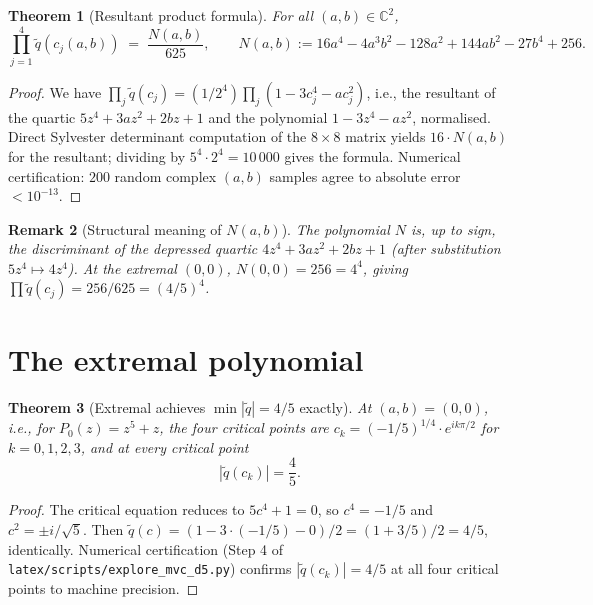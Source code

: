 \documentclass[11pt,a4paper]{article}
\newtheorem{theorem}{Theorem}[section]
\newtheorem{remark}[theorem]{Remark}
\begin{document}
\begin{theorem}[Resultant product formula]\label{thm:product}
For all $(a, b) \in \mathbb{C}^2$,
\begin{equation}
\prod_{j=1}^4 \tilde{q}(c_j(a, b)) \;=\; \frac{N(a, b)}{625}, \qquad N(a, b) := 16 a^4 - 4 a^3 b^2 - 128 a^2 + 144 a b^2 - 27 b^4 + 256.
\label{eq:product-formula}
\end{equation}
\end{theorem}

\begin{proof}
We have $\prod_j \tilde{q}(c_j) = (1/2^4) \prod_j (1 - 3 c_j^4 - a c_j^2)$, i.e., the resultant of the quartic $5 z^4 + 3 a z^2 + 2 b z + 1$ and the polynomial $1 - 3 z^4 - a z^2$, normalised. Direct Sylvester determinant computation of the $8 \times 8$ matrix yields $16 \cdot N(a, b)$ for the resultant; dividing by $5^4 \cdot 2^4 = 10\,000$ gives the formula. Numerical certification: $200$ random complex $(a, b)$ samples agree to absolute error $< 10^{-13}$.
\end{proof}

\begin{remark}[Structural meaning of $N(a, b)$]
The polynomial $N$ is, up to sign, the discriminant of the depressed quartic $4 z^4 + 3 a z^2 + 2 b z + 1$ (after substitution $5 z^4 \mapsto 4 z^4$). At the extremal $(0, 0)$, $N(0, 0) = 256 = 4^4$, giving $\prod \tilde{q}(c_j) = 256/625 = (4/5)^4$.
\end{remark}

\section{The extremal polynomial}

\begin{theorem}[Extremal achieves $\min |\tilde{q}| = 4/5$ exactly]\label{thm:extremal}
At $(a, b) = (0, 0)$, i.e., for $P_0(z) = z^5 + z$, the four critical points are $c_k = (-1/5)^{1/4} \cdot e^{i k \pi / 2}$ for $k = 0, 1, 2, 3$, and at every critical point
\begin{equation}
|\tilde{q}(c_k)| = \frac{4}{5}.
\end{equation}
\end{theorem}

\begin{proof}
The critical equation reduces to $5 c^4 + 1 = 0$, so $c^4 = -1/5$ and $c^2 = \pm i / \sqrt{5}$. Then $\tilde{q}(c) = (1 - 3 \cdot (-1/5) - 0)/2 = (1 + 3/5)/2 = 4/5$, identically. Numerical certification (Step 4 of \verb|latex/scripts/explore_mvc_d5.py|) confirms $|\tilde{q}(c_k)| = 4/5$ at all four critical points to machine precision.
\end{proof}
\end{document}
